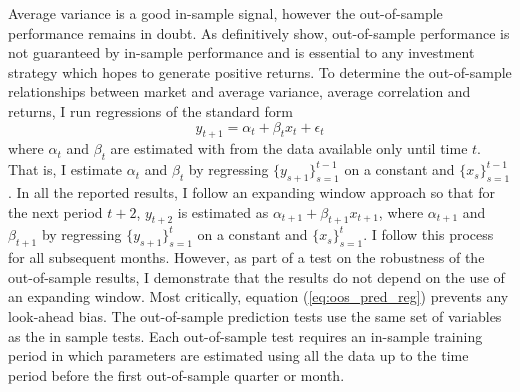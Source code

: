 Average variance is a good in-sample signal, however the out-of-sample performance remains in doubt. As \citet{Welch2008} definitively show, out-of-sample performance is not guaranteed by in-sample performance and is essential to any investment strategy which hopes to generate positive returns. To determine the out-of-sample relationships between market and average variance, average correlation and returns, I run regressions of the standard form
\begin{equation}
	\label{eq:oos_pred_reg}
	y_{t+1} = \alpha_{t} + \beta_{t}x_{t} + \epsilon_{t}
\end{equation}
where $\alpha_{t}$ and $\beta_{t}$ are estimated with from the data available only until time $t$. That is, I estimate
$\alpha_{t}$ and $ \beta_{t}$ by regressing $\{y_{s+1}\}_{s=1}^{t-1}$ on a constant and $\{x_{s}\}_{s=1}^{t-1}$. In all the reported results, I follow an expanding window approach so that for the next period $t+2$, $ y_{t+2}$ is estimated as $\alpha_{t+1} +  \beta_{t+1}x_{t+1}$, where $\alpha_{t+1}$ and $ \beta_{t+1}$ by regressing $\{y_{s+1}\}_{s=1}^{t}$ on a constant and $\{x_{s}\}_{s=1}^{t}$. I follow this process for all subsequent months. However, as part of a test on the robustness of the out-of-sample results, I demonstrate that the results do not depend on the use of an expanding window. Most critically, equation (\ref{eq:oos_pred_reg}) prevents any look-ahead bias. The out-of-sample prediction tests use the same set of variables as the in sample tests. Each out-of-sample test requires an in-sample training period in which parameters are estimated using all the data up to the time period before the first out-of-sample quarter or month.

